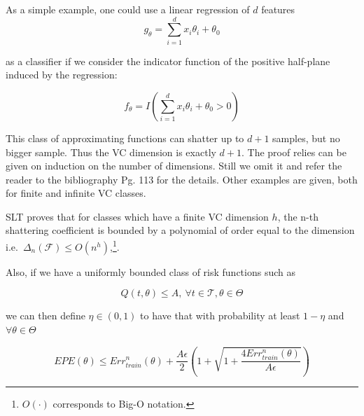 \begin{appendices}
As a simple example, one could use a linear regression of $d$ features
\begin{equation}
g_{\theta} = \sum_{i=1}^d x_i \theta_i + \theta_0
\end{equation}

 as a classifier if we consider the indicator function of the positive half-plane induced by the regression:

\begin{equation}
f_{\theta} = I(\sum_{i=1}^d x_i \theta_i + \theta_0 > 0)
\end{equation}

This class of approximating functions can shatter up to $d+1$ samples, but no bigger sample.
Thus the VC dimension is exactly $d+1$.
The proof relies can be given on induction on the number of dimensions.
Still we omit it and refer the reader to the bibliography \textcite{cherkassky-learning2007} Pg.
113 for the details.
Other examples are given, both for finite and infinite VC classes.


SLT proves that for classes which have a finite VC dimension $h$, the n-th shattering coefficient is bounded by a polynomial of order equal to the dimension
i.e.\ $\Delta_n(\mathcal {F}) \leq O(n^{h})$,\footnote{$O(\cdot)$ corresponds to Big-O notation.}.


Also, if we have a uniformly bounded class of risk functions such as

\begin{equation}
Q(t,\theta) \leq A,  \ \forall t \in \mathcal {T}, \theta \in \Theta
\end{equation}

we can then define $\eta \in (0,1)$ to have that with probability at least $1 - \eta$ and $\forall \theta \in \Theta$

\begin{equation}
EPE(\theta) \leq Err^n_{train}(\theta) + \frac{A \epsilon}{2} \left(1 + \sqrt{1 + \frac{4 Err^n_{train}(\theta) }{A \epsilon}} \right)
\end{equation}\label{eq:vapnik-classificationBound}




\end{appendices}
